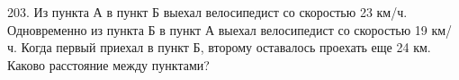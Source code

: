 203. Из пункта А в пункт Б выехал велосипедист со скоростью 23 км/ч. Одновременно из пункта Б в пункт А выехал велосипедист со скоростью 19 км/ч. Когда первый приехал в пункт Б, второму оставалось проехать еще 24 км. Каково расстояние между пунктами?\\
